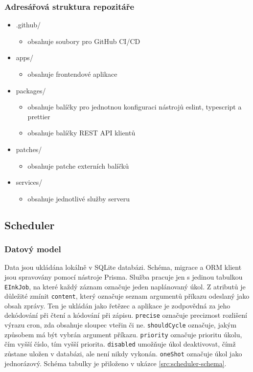 \subsubsection{Adresářová struktura repozitáře}
\begin{itemize}
    \item .github/
        \begin{itemize}
            \item obsahuje soubory pro GitHub CI/CD
        \end{itemize}
    \item apps/
        \begin{itemize}
            \item obsahuje frontendové aplikace
        \end{itemize}
    \item packages/
        \begin{itemize}
            \item obsahuje balíčky pro jednotnou konfiguraci nástrojů eslint, typescript a prettier
            \item obsahuje balíčky REST API klientů
        \end{itemize}
    \item patches/
        \begin{itemize}
            \item obsahuje patche externích balíčků
        \end{itemize}
    \item services/
        \begin{itemize}
            \item obsahuje jednotlivé služby serveru
        \end{itemize}
\end{itemize}

\subsection{Scheduler}
\subsubsection{Datový model}
Data jsou ukládána lokálně v SQLite databázi. Schéma, migrace a ORM klient jsou spravovány pomocí nástroje Prisma. Služba pracuje jen s jedinou tabulkou \lstinline|EInkJob|, na které každý záznam označuje jeden naplánovaný úkol. Z atributů je důležité zmínit \lstinline|content|, který označuje seznam argumentů příkazu odeslaný jako obsah zprávy. Ten je ukládán jako řetězec a aplikace je zodpovědná za jeho dekódování při čtení a kódování při zápisu. \lstinline|precise| označuje preciznost rozlišení výrazu cron, zda obsahuje sloupec vteřin či ne. \lstinline|shouldCycle| označuje, jakým způsobem má být vybrán argument příkazu. \lstinline|priority| označuje prioritu úkolu, čím vyšší číslo, tím vyšší priorita. \lstinline|disabled| umožňuje úkol deaktivovat, čímž zůstane uložen v databázi, ale není nikdy vykonán. \lstinline|oneShot| označuje úkol jako jednorázový. Schéma tabulky je přiloženo v ukázce \ref{src:scheduler-schema}.

